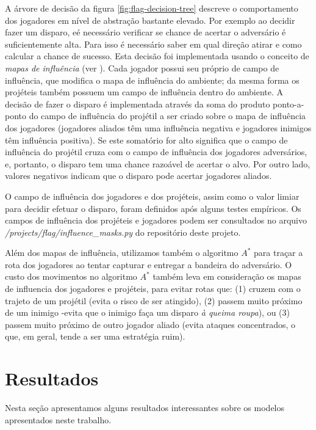 \documentclass[preprint,12pt]{elsarticle}
\begin{document}
A árvore de decisão da figura \ref{fig:flag-decision-tree} descreve o comportamento dos jogadores em nível de abstração bastante elevado. Por exemplo ao decidir fazer um disparo, eé necessário verificar se chance de acertar o adversário é suficientemente alta. Para isso é necessário saber em qual direção atirar e como calcular a chance de sucesso. Esta decisão foi implementada usando o conceito de \textit{mapas de influência} (ver \cite{millington2016artificial}). Cada jogador possui seu próprio de campo de influência, que modifica o mapa de influência do ambiente; da mesma forma os projéteis também possuem um campo de influência dentro do ambiente. A decisão de fazer o disparo é implementada através da soma do produto ponto-a-ponto do campo de influência do projétil a ser criado sobre o mapa de influência dos jogadores (jogadores aliados têm uma influência negativa e jogadores inimigos têm influência positiva). Se este somatório for alto significa que o campo de influência do projétil cruza com o campo de influência dos jogadores adversários, e, portanto, o disparo tem uma chance razoável de acertar o alvo. Por outro lado, valores negativos indicam que o disparo pode acertar jogadores aliados.

O campo de influência dos jogadores e dos projéteis, assim como o valor limiar para decidir efetuar o disparo, foram definidos após alguns testes empíricos. Os campos de influência dos projéteis e jogadores podem ser consultados no arquivo \textit{/projects/flag/influence\_masks.py} do repositório deste projeto.

Além dos mapas de influência, utilizamos também o algoritmo $A^*$ para traçar a rota dos jogadores ao tentar capturar e entregar a bandeira do adversário. O custo dos movimentos no algoritmo $A^*$ também leva em consideração os mapas de influencia dos jogadores e projéteis, para evitar rotas que: (1) cruzem com o trajeto de um projétil (evita o risco de ser atingido), (2) passem muito próximo de um inimigo -evita que o inimigo faça um disparo \textit{à queima roupa}), ou (3) passem muito próximo de outro jogador aliado (evita ataques concentrados, o que, em geral, tende a ser uma estratégia ruim).

\section{Resultados}
\label{sec:resultados}

Nesta seção apresentamos alguns resultados interessantes sobre os modelos apresentados neste trabalho.
\end{document}
